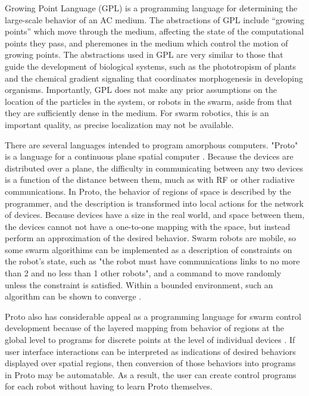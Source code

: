 \documentclass[]{article}
\begin{document}
Growing Point Language (GPL) is a programming language for determining the large-scale behavior of an AC medium.
The abstractions of GPL include ``growing points'' which move through the medium, affecting the state of the computational points they pass, and pheremones in the medium which control the motion of growing points.
The abstractions used in GPL are very similar to those that guide the development of biological systems, such as the phototropism of plants and the chemical gradient signaling that coordinates morphogenesis in developing organisms.   
Importantly, GPL does not make any prior assumptions on the location of the particles in the system, or robots in the swarm, aside from that they are sufficiently dense in the medium. 
For swarm robotics, this is an important quality, as precise localization may not be available. 
 
There are several languages intended to program amorphous computers. 
"Proto" is a language for a continuous plane spatial computer \cite{correll2009ad}.
Because the devices are distributed over a plane, the difficulty in communicating between any two devices is a function of the distance between them, much as with RF or other radiative communications.
In Proto, the behavior of regions of space is described by the programmer, and the description is transformed into local actions for the network of devices. 
Because devices have a size in the real world, and space between them, the devices cannot not have a one-to-one mapping with the space, but instead perform an approximation of the desired behavior. 
Swarm robots are mobile, so some swarm algorithims can be implemented as a description of constraints on the robot's state, such as "the robot must have communications links to no more than 2 and no less than 1 other robots", and a command to move randomly unless the constraint is satisfied. 
Within a bounded environment, such an algorithm can be shown to converge \cite{correll2009ad}. 

Proto also has considerable appeal as a programming language for swarm control development because of the layered mapping from behavior of regions at the global level to programs for discrete points at the level of individual devices \cite{beal2006infrastructure}. 
If user interface interactions can be interpreted as indications of desired behaviors displayed over spatial regions, then conversion of those behaviors into programs in Proto may be automatable. 
As a result, the user can create control programs for each robot without having to learn Proto themselves.  
\end{document}
